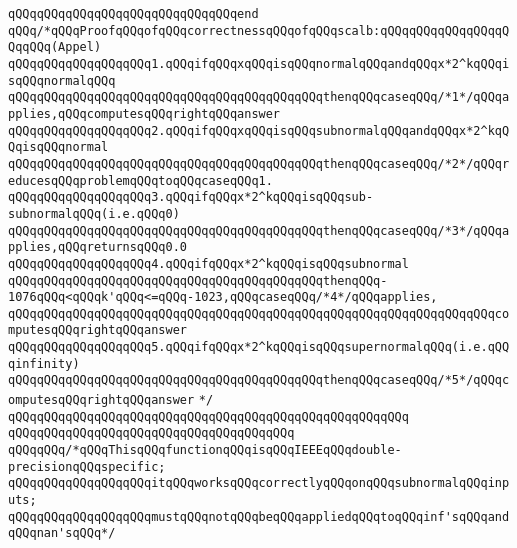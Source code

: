 \verb|qQQqqQQqqQQqqQQqqQQqqQQqqQQqqQQqend|\newline
\verb|qQQq/*qQQqProofqQQqofqQQqcorrectnessqQQqofqQQqscalb:qQQqqQQqqQQqqQQqqQQqqQQq(Appel)|\newline
\verb|qQQqqQQqqQQqqQQqqQQq1.qQQqifqQQqxqQQqisqQQqnormalqQQqandqQQqx*2^kqQQqisqQQqnormalqQQq|\newline
\verb|qQQqqQQqqQQqqQQqqQQqqQQqqQQqqQQqqQQqqQQqqQQqthenqQQqcaseqQQq/*1*/qQQqapplies,qQQqcomputesqQQqrightqQQqanswer|\newline
\verb|qQQqqQQqqQQqqQQqqQQq2.qQQqifqQQqxqQQqisqQQqsubnormalqQQqandqQQqx*2^kqQQqisqQQqnormal|\newline
\verb|qQQqqQQqqQQqqQQqqQQqqQQqqQQqqQQqqQQqqQQqqQQqthenqQQqcaseqQQq/*2*/qQQqreducesqQQqproblemqQQqtoqQQqcaseqQQq1.|\newline
\verb|qQQqqQQqqQQqqQQqqQQq3.qQQqifqQQqx*2^kqQQqisqQQqsub-subnormalqQQq(i.e.qQQq0)|\newline
\verb|qQQqqQQqqQQqqQQqqQQqqQQqqQQqqQQqqQQqqQQqqQQqthenqQQqcaseqQQq/*3*/qQQqapplies,qQQqreturnsqQQq0.0|\newline
\verb|qQQqqQQqqQQqqQQqqQQq4.qQQqifqQQqx*2^kqQQqisqQQqsubnormal|\newline
\verb|qQQqqQQqqQQqqQQqqQQqqQQqqQQqqQQqqQQqqQQqqQQqthenqQQq-1076qQQq<qQQqk'qQQq<=qQQq-1023,qQQqcaseqQQq/*4*/qQQqapplies,|\newline
\verb|qQQqqQQqqQQqqQQqqQQqqQQqqQQqqQQqqQQqqQQqqQQqqQQqqQQqqQQqqQQqqQQqqQQqcomputesqQQqrightqQQqanswer|\newline
\verb|qQQqqQQqqQQqqQQqqQQq5.qQQqifqQQqx*2^kqQQqisqQQqsupernormalqQQq(i.e.qQQqinfinity)|\newline
\verb|qQQqqQQqqQQqqQQqqQQqqQQqqQQqqQQqqQQqqQQqqQQqthenqQQqcaseqQQq/*5*/qQQqcomputesqQQqrightqQQqanswer|\newline
\verb|*/|\newline
\verb|qQQqqQQqqQQqqQQqqQQqqQQqqQQqqQQqqQQqqQQqqQQqqQQqqQQqqQQq|\newline
\verb|qQQqqQQqqQQqqQQqqQQqqQQqqQQqqQQqqQQqqQQq|\newline
\newline
\newline
\newline
\verb|qQQqqQQq/*qQQqThisqQQqfunctionqQQqisqQQqIEEEqQQqdouble-precisionqQQqspecific;|\newline
\verb|qQQqqQQqqQQqqQQqqQQqitqQQqworksqQQqcorrectlyqQQqonqQQqsubnormalqQQqinputs;|\newline
\verb|qQQqqQQqqQQqqQQqqQQqmustqQQqnotqQQqbeqQQqappliedqQQqtoqQQqinf'sqQQqandqQQqnan'sqQQq*/|\newline
